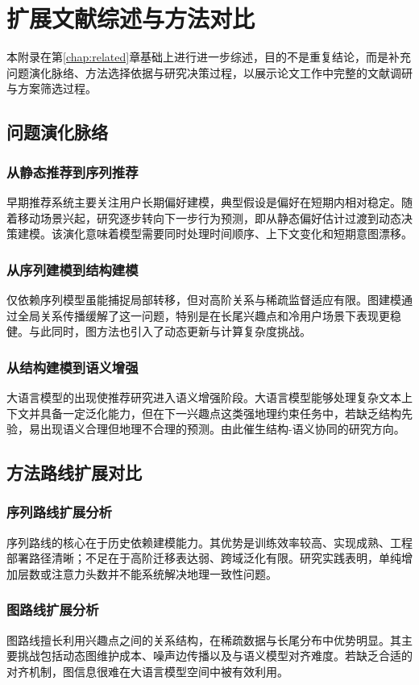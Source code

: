 \chapter{扩展文献综述与方法对比}
\label{appx:survey}

本附录在第\ref{chap:related}章基础上进行进一步综述，目的不是重复结论，而是补充问题演化脉络、方法选择依据与研究决策过程，以展示论文工作中完整的文献调研与方案筛选过程。

\section{问题演化脉络}
\subsection{从静态推荐到序列推荐}
早期推荐系统主要关注用户长期偏好建模，典型假设是偏好在短期内相对稳定。随着移动场景兴起，研究逐步转向下一步行为预测，即从静态偏好估计过渡到动态决策建模。该演化意味着模型需要同时处理时间顺序、上下文变化和短期意图漂移。

\subsection{从序列建模到结构建模}
仅依赖序列模型虽能捕捉局部转移，但对高阶关系与稀疏监督适应有限。图建模通过全局关系传播缓解了这一问题，特别是在长尾兴趣点和冷用户场景下表现更稳健。与此同时，图方法也引入了动态更新与计算复杂度挑战。

\subsection{从结构建模到语义增强}
大语言模型的出现使推荐研究进入语义增强阶段。大语言模型能够处理复杂文本上下文并具备一定泛化能力，但在下一兴趣点这类强地理约束任务中，若缺乏结构先验，易出现语义合理但地理不合理的预测。由此催生结构-语义协同的研究方向。

\section{方法路线扩展对比}
\subsection{序列路线扩展分析}
序列路线的核心在于历史依赖建模能力。其优势是训练效率较高、实现成熟、工程部署路径清晰；不足在于高阶迁移表达弱、跨域泛化有限。研究实践表明，单纯增加层数或注意力头数并不能系统解决地理一致性问题。

\subsection{图路线扩展分析}
图路线擅长利用兴趣点之间的关系结构，在稀疏数据与长尾分布中优势明显。其主要挑战包括动态图维护成本、噪声边传播以及与语义模型对齐难度。若缺乏合适的对齐机制，图信息很难在大语言模型空间中被有效利用。


